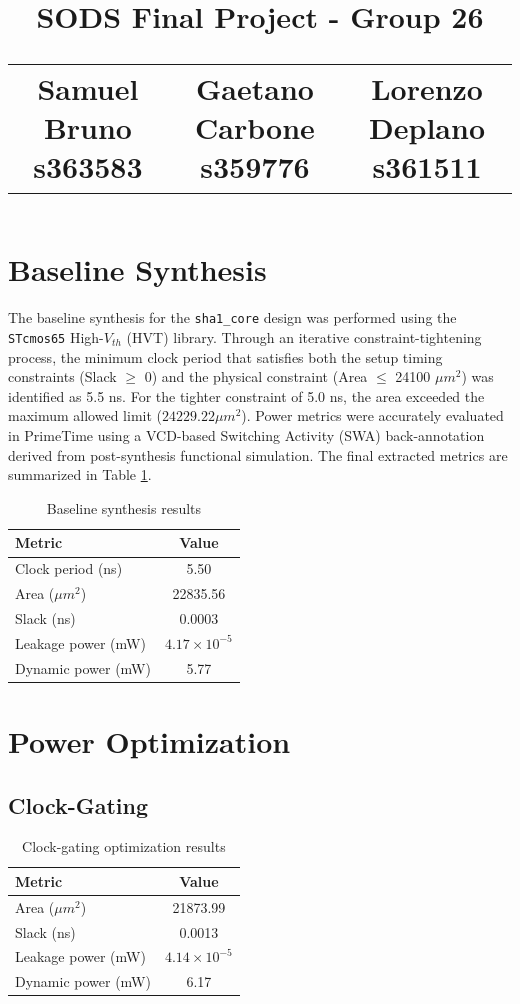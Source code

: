 \documentclass[11pt,a4paper]{article}
\title{
    \textbf{SODS Final Project - Group 26}\\[0.5em]
    \large
    \begin{tabular}{ccc}
        Samuel Bruno s363583 & Gaetano Carbone s359776 & Lorenzo Deplano s361511
    \end{tabular}
}
\begin{document}
\date{}

\maketitle
\vspace{-2cm}
\section{Baseline Synthesis}
The baseline synthesis for the \texttt{sha1\_core} design was performed using the \texttt{STcmos65} High-$V_{th}$ (HVT) library. Through an iterative constraint-tightening process, the minimum clock period that satisfies both the setup timing constraints (Slack $\ge$ 0) and the physical constraint (Area $\le$ 24100 $\mu m^2$) was identified as 5.5 ns. For the tighter constraint of 5.0 ns, the area exceeded the maximum allowed limit ($24229.22 \mu m^2$). Power metrics were accurately evaluated in PrimeTime using a VCD-based Switching Activity (SWA) back-annotation derived from post-synthesis functional simulation. The final extracted metrics are summarized in Table \ref{tab:baseline}.

\begin{table}[h]
\centering
\caption{Baseline synthesis results}
\label{tab:baseline}
\begin{tabular}{lc}
\toprule
\textbf{Metric} & \textbf{Value} \\
\midrule
Clock period (ns) & 5.50 \\
Area ($\mu m^2$) & 22835.56 \\
Slack (ns) & 0.0003 \\
Leakage power (mW) & $4.17 \times 10^{-5}$ \\
Dynamic power (mW) & 5.77 \\
\bottomrule
\end{tabular}
\end{table}

\section{Power Optimization}

\subsection{Clock-Gating}

\begin{table}[h]
\centering
\caption{Clock-gating optimization results}
\label{tab:clockgating}
\begin{tabular}{lc}
\toprule
\textbf{Metric} & \textbf{Value} \\
\midrule
Area ($\mu m^2$) & 21873.99 \\
Slack (ns) & 0.0013 \\
Leakage power (mW) & $4.14 \times 10^{-5}$ \\
Dynamic power (mW) & 6.17 \\
\bottomrule
\end{tabular}
\end{table}
\end{document}
